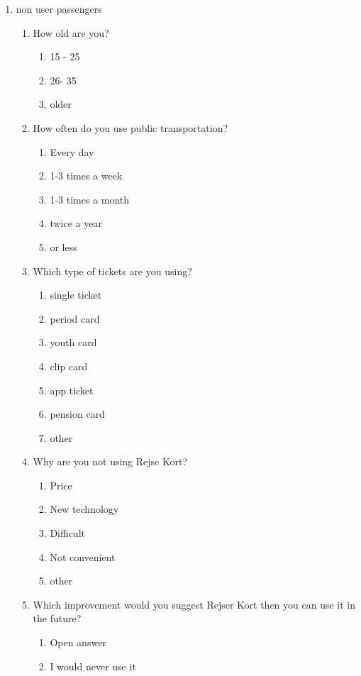 \begin{enumerate}
\begin{enumerate}
	\item non user passengers
		\begin{enumerate} %
			\item How old are you?
				\begin{enumerate}Range
					\item 15 - 25
					\item 26- 35
					\item older
				\end{enumerate}
			
			\item How often do you use public transportation?
				\begin{enumerate}
					\item Every day
					\item 1-3 times a week
					\item 1-3 times a month
					\item twice a year
					\item or less
				\end{enumerate}
			
			\item Which type of tickets are you using?
				\begin{enumerate}
					\item single ticket
					\item period card
					\item youth card
					\item clip card
					\item app ticket
					\item pension card
					\item other
				\end{enumerate}
			
			\item Why are you not using Rejse Kort?
				\begin{enumerate}
					\item Price
					\item New technology
					\item Difficult
					\item Not convenient
					\item other
				\end{enumerate}
			
			\item Which improvement would you suggest Rejser Kort then you can use it in the future?
				\begin{enumerate}
					\item Open answer
					\item I would never use it
				\end{enumerate}	
		\end{enumerate}%
	

\end{enumerate}
\end{enumerate}
